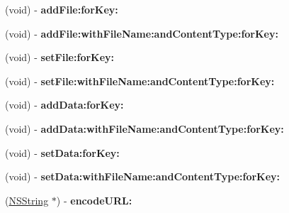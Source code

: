 \begin{DoxyCompactItemize}
\item 
\hypertarget{interface_a_s_i_form_data_request_afa340cd3b263a621a4f52015cdb8c568}{
(void) -\/ {\bfseries add\-File\-:for\-Key\-:}}
\label{interface_a_s_i_form_data_request_afa340cd3b263a621a4f52015cdb8c568}

\item 
\hypertarget{interface_a_s_i_form_data_request_ae413f676daaf869aa3cac76371466c16}{
(void) -\/ {\bfseries add\-File\-:with\-File\-Name\-:and\-Content\-Type\-:for\-Key\-:}}
\label{interface_a_s_i_form_data_request_ae413f676daaf869aa3cac76371466c16}

\item 
\hypertarget{interface_a_s_i_form_data_request_a8b097474a664290880231fd4439f352e}{
(void) -\/ {\bfseries set\-File\-:for\-Key\-:}}
\label{interface_a_s_i_form_data_request_a8b097474a664290880231fd4439f352e}

\item 
\hypertarget{interface_a_s_i_form_data_request_a1b319de7b302e41e0f2b62b04efd4976}{
(void) -\/ {\bfseries set\-File\-:with\-File\-Name\-:and\-Content\-Type\-:for\-Key\-:}}
\label{interface_a_s_i_form_data_request_a1b319de7b302e41e0f2b62b04efd4976}

\item 
\hypertarget{interface_a_s_i_form_data_request_abeb27ef3dc358d5e0a27ba3a077a6653}{
(void) -\/ {\bfseries add\-Data\-:for\-Key\-:}}
\label{interface_a_s_i_form_data_request_abeb27ef3dc358d5e0a27ba3a077a6653}

\item 
\hypertarget{interface_a_s_i_form_data_request_a8ea88f81e036a80e7e7b7f9af04ac421}{
(void) -\/ {\bfseries add\-Data\-:with\-File\-Name\-:and\-Content\-Type\-:for\-Key\-:}}
\label{interface_a_s_i_form_data_request_a8ea88f81e036a80e7e7b7f9af04ac421}

\item 
\hypertarget{interface_a_s_i_form_data_request_a707a5cef615835146cdbed3ceca31016}{
(void) -\/ {\bfseries set\-Data\-:for\-Key\-:}}
\label{interface_a_s_i_form_data_request_a707a5cef615835146cdbed3ceca31016}

\item 
\hypertarget{interface_a_s_i_form_data_request_abbcca0f83bbe93f0132094a99a274098}{
(void) -\/ {\bfseries set\-Data\-:with\-File\-Name\-:and\-Content\-Type\-:for\-Key\-:}}
\label{interface_a_s_i_form_data_request_abbcca0f83bbe93f0132094a99a274098}

\item 
\hypertarget{interface_a_s_i_form_data_request_ab8c6677cbdb0cd4bf7660b79e5afa334}{
(\hyperlink{class_n_s_string}{\-N\-S\-String} $\ast$) -\/ {\bfseries encode\-U\-R\-L\-:}}
\label{interface_a_s_i_form_data_request_ab8c6677cbdb0cd4bf7660b79e5afa334}


\end{DoxyCompactItemize}
